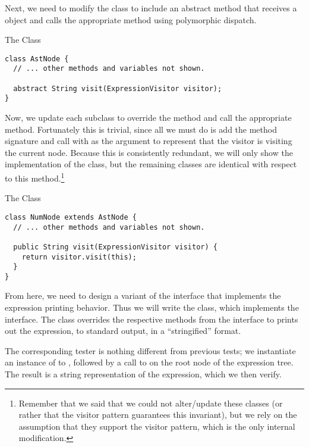 \begin{verbnobox}[\footnotesize]
Next, we need to modify the  class to include an abstract  method that receives a  object and calls the appropriate  method using polymorphic dispatch. 

\begin{cl}[]{The  Class}
\begin{lstlisting}[language=MyJava]
class AstNode {
  // ... other methods and variables not shown.

  abstract String visit(ExpressionVisitor visitor);
}
\end{lstlisting}
\end{cl}

Now, we update each subclass to override the  method and call the appropriate  method. Fortunately this is trivial, since all we must do is add the method signature and call  with  as the argument to represent that the visitor is visiting the current node. Because this is consistently redundant, we will only show the implementation of the  class, but the remaining classes are identical with respect to this method.\footnote{Remember that we said that we could not alter/update these classes (or rather that the visitor pattern guarantees this invariant), but we rely on the assumption that they support the visitor pattern, which is the only internal modification.}

\begin{cl}[]{The  Class}
\begin{lstlisting}[language=MyJava]
class NumNode extends AstNode {
  // ... other methods and variables not shown.

  public String visit(ExpressionVisitor visitor) {
    return visitor.visit(this);
  }
}
\end{lstlisting}
\end{cl}

From here, we need to design a variant of the interface that implements the expression printing behavior. Thus we will write the  class, which implements the  interface. The  class overrides the respective methods from the  interface to prints out the expression, to standard output, in a ``stringified'' format.

The corresponding tester is nothing different from previous tests; we instantiate an instance of  to , followed by a call to  on the root node of the expression tree. The result is a string representation of the expression, which we then verify.


\end{verbnobox}
